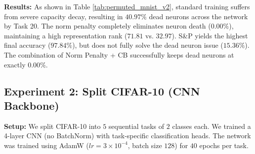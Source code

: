 \documentclass[11pt,a4paper]{article}
\begin{document}
\textbf{Results:} As shown in Table \ref{tab:permuted_mnist_v2}, standard training suffers from severe capacity decay, resulting in $40.97\%$ dead neurons across the network by Task 20. The norm penalty completely eliminates neuron death ($0.00\%$), maintaining a high representation rank ($71.81$ vs. $32.97$). S\&P yields the highest final accuracy ($97.84\%$), but does not fully solve the dead neuron issue ($15.36\%$). The combination of Norm Penalty + CB successfully keeps dead neurons at exactly $0.00\%$.

\begin{table}[ht]
\centering
\caption{Permuted MNIST v2 results (3-layer MLP, 20 tasks, 3 seeds).}
\label{tab:permuted_mnist_v2}
\end{table}

\subsection{Experiment 2: Split CIFAR-10 (CNN Backbone)}
\textbf{Setup:} We split CIFAR-10 into $5$ sequential tasks of $2$ classes each. We trained a 4-layer CNN (no BatchNorm) with task-specific classification heads. The network was trained using AdamW ($lr=3\times 10^{-4}$, batch size $128$) for $40$ epochs per task.
\end{document}
